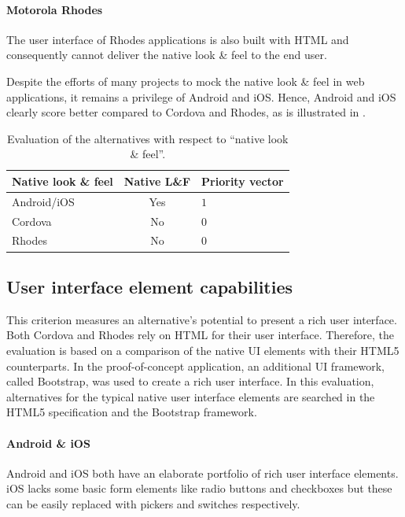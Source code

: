 \paragraph{Motorola Rhodes} The user interface of Rhodes applications is also built with HTML and consequently cannot deliver the native look \& feel to the end user.

Despite the efforts of many projects to mock the native look \& feel in web applications, it remains a privilege of Android and iOS. Hence, Android and iOS clearly score better compared to Cordova and Rhodes, as is illustrated in .

\begin{table}[h!]
    \centering
    \begin{tabular}{lcl}
        \hline
        \textbf{Native look \& feel} & Native L\&F & Priority vector \\
        \hline
        Android/iOS                  & Yes         & $1$             \\
        Cordova                      & No          & $0$             \\
        Rhodes                       & No          & $0$             \\
        \hline
    \end{tabular}
    \caption{Evaluation of the alternatives with respect to ``native look \& feel''.}
    \label{tab:nlf}
\end{table}

\subsection{User interface element capabilities}

This criterion measures an alternative's potential to present a rich user interface. Both Cordova and Rhodes rely on HTML for their user interface. Therefore, the evaluation is based on a comparison of the native UI elements with their HTML5 counterparts. In the proof-of-concept application, an additional UI framework, called Bootstrap, was used to create a rich user interface. In this evaluation, alternatives for the typical native user interface elements are searched in the HTML5 specification and the Bootstrap framework.

\paragraph{Android \& iOS} Android and iOS both have an elaborate portfolio of rich user interface elements. iOS lacks some basic form elements like radio buttons and checkboxes but these can be easily replaced with pickers and switches respectively.

